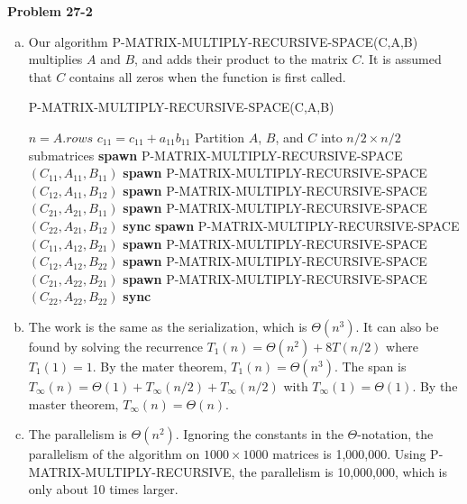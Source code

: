 \documentclass{article}
\begin{document}
\noindent\textbf{Problem 27-2}\\
\begin{enumerate}[a.]
\item Our algorithm P-MATRIX-MULTIPLY-RECURSIVE-SPACE(C,A,B) multiplies $A$ and $B$, and adds their product to the matrix $C$. It is assumed that $C$ contains all zeros when the function is first called.\\

\begin{algorithm}
\caption{P-MATRIX-MULTIPLY-RECURSIVE-SPACE(C,A,B)}
\begin{algorithmic}[1]
\State $n = A.rows$
	\State $c_11 = c_11 + a_11b_11$
\Else
	\State Partition $A$, $B$, and $C$ into $n/2 \times n/2$ submatrices
	\State \textbf{spawn} P-MATRIX-MULTIPLY-RECURSIVE-SPACE$(C_{11}, A_{11}, B_{11})$
	\State \textbf{spawn} P-MATRIX-MULTIPLY-RECURSIVE-SPACE$(C_{12}, A_{11}, B_{12})$
	\State \textbf{spawn} P-MATRIX-MULTIPLY-RECURSIVE-SPACE$(C_{21}, A_{21}, B_{11})$
	\State \textbf{spawn} P-MATRIX-MULTIPLY-RECURSIVE-SPACE$(C_{22}, A_{21}, B_{12})$
	\State \textbf{sync}
	\State \textbf{spawn} P-MATRIX-MULTIPLY-RECURSIVE-SPACE$(C_{11}, A_{12}, B_{21})$
	\State \textbf{spawn} P-MATRIX-MULTIPLY-RECURSIVE-SPACE$(C_{12}, A_{12}, B_{22})$
	\State \textbf{spawn} P-MATRIX-MULTIPLY-RECURSIVE-SPACE$(C_{21}, A_{22}, B_{21})$
	\State \textbf{spawn} P-MATRIX-MULTIPLY-RECURSIVE-SPACE$(C_{22}, A_{22}, B_{22})$
	\State \textbf{sync}
\EndIf
\end{algorithmic}
\end{algorithm}

\item The work is the same as the serialization, which is $\Theta(n^3)$.  It can also be found by solving the recurrence $T_1(n) = \Theta(n^2) + 8T(n/2) $ where $T_1(1) = 1$.  By the mater theorem, $T_1(n) = \Theta(n^3)$.  The span is $T_\infty(n) = \Theta(1) + T_\infty(n/2) + T_\infty(n/2)$ with $T_\infty(1) = \Theta(1)$.  By the master theorem, $T_\infty(n) = \Theta(n)$. \\

\item The parallelism is $\Theta(n^2)$.  Ignoring the constants in the $\Theta$-notation, the parallelism of the algorithm on $1000 \times 1000$ matrices is 1,000,000.  Using P-MATRIX-MULTIPLY-RECURSIVE, the parallelism is 10,000,000, which is only about 10 times larger. \\
\end{enumerate}
\end{document}
